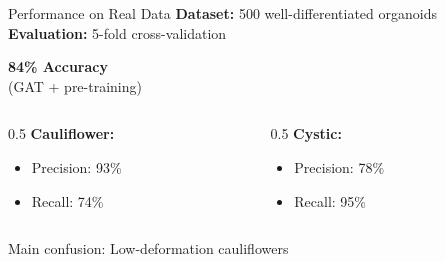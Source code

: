 \documentclass[aspectratio=169]{beamer}
\begin{document}
\begin{frame}{Performance on Real Data}
    \textbf{Dataset:} 500 well-differentiated organoids\\
    \textbf{Evaluation:} 5-fold cross-validation
    
    \vspace{0.5em}
    \begin{center}
        {\Huge \textbf{84\% Accuracy}}\\
        {\large (GAT + pre-training)}
    \end{center}
    
    \vspace{0.5em}
    \begin{columns}
        \begin{column}{0.5\textwidth}
            \textbf{Cauliflower:}
            \begin{itemize}
                \item Precision: 93\%
                \item Recall: 74\%
            \end{itemize}
        \end{column}
        \begin{column}{0.5\textwidth}
            \textbf{Cystic:}
            \begin{itemize}
                \item Precision: 78\%
                \item Recall: 95\%
            \end{itemize}
        \end{column}
    \end{columns}
    
    \vspace{0.5em}
    {\small Main confusion: Low-deformation cauliflowers}
\end{frame}
\end{document}

